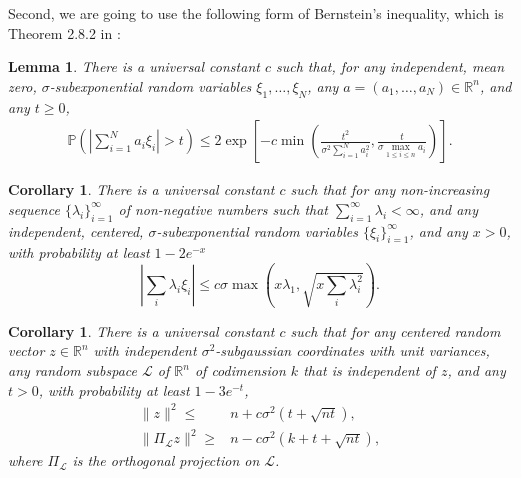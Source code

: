 \documentclass[11pt,notitlepage]{article}
\newcommand\Ls {\mathscr{L}}
\newcommand\Pbb {\mathbb{P}}
\newcommand\R {\mathbb{R}}
\renewcommand\Re{\R}
\newtheorem{lemma}[theorem]{Lemma}
\newtheorem{cor}[theorem]{Corollary}
\begin{document}
Second, we are going to use the following form of Bernstein's inequality, which is Theorem 2.8.2 in \cite{vershynin_2018}:
\begin{lemma}\label{lemma:Bernstein}
    There is a universal constant $c$ such that, for any
	independent, mean zero, $\sigma$-subexponential random variables
	$\xi_1, \dots, \xi_N$, any $a = (a_1, \dots, a_N)\in \Re^n$, and
    any $t \geq 0$,
	  \begin{align*}
	    \Pbb\left(\left|\sum_{i=1}^N a_i \xi_i\right| > t\right)
            \leq 2\exp\left[-c\min\left(\frac{t^2}{\sigma^2 \sum_{i=1}^N
        a_i^2}, \frac{t}{\sigma \max_{1 \leq i \leq n}
        a_i}\right)\right].
	  \end{align*}
\end{lemma}
\begin{cor}\label{cor:Bernstein}
    There is a universal constant $c$ such that for any
	non-increasing sequence $\{\lambda_i\}_{i =1}^\infty $
    of non-negative numbers such that
    $\sum_{i=1}^\infty \lambda_i < \infty$, and any
    independent, centered, $\sigma$-subexponential random variables
    $\{\xi_i\}_{i = 1}^\infty$, and any $x > 0$, with probability
    at least $1-2e^{-x}$
	  \[
	    \left|\sum_{i} \lambda_i \xi_i\right| \leq
        c\sigma\max\left(x\lambda_1, \sqrt{x \sum_{i}
        \lambda_i^2}\right).
	  \]
\end{cor}
\begin{cor}\label{cor:norm of projection}
    There is a universal constant $c$ such that for any
	centered random vector $z\in \Re^n$ with independent
    $\sigma^2$-subgaussian coordinates with unit variances, any
    random subspace $\Ls$ of $\Re^n$ of codimension $k$ that is
    independent of $z$, and any $t > 0$, with probability at
    least $1-3e^{-t}$,
	  \begin{align*}
	    \|z\|^2 \leq& n + c\sigma^2(t + \sqrt{nt}),\\
	    \|\Pi_{\Ls} z\|^2 \geq& n - c\sigma^2(k + t + \sqrt{nt}),
	  \end{align*}
	where $\Pi_{\Ls}$ is the orthogonal projection on $\Ls$.
\end{cor}
\end{document}
